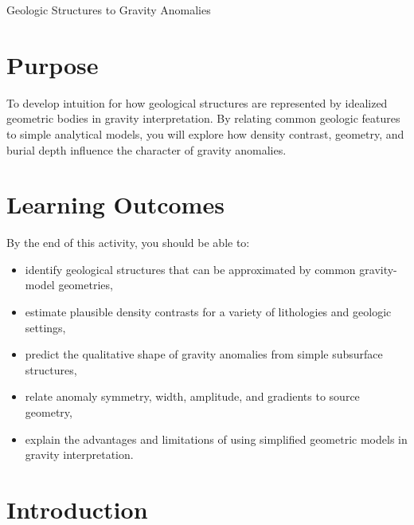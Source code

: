 \newcommand\gax{
  \begin{center}
    \begin{tikzpicture}[scale=0.85]
      \draw[->] (-5,0) -- (5,0) node[above right] {$x$};
      \draw[->] (-5,-1.1) -- (-5,1.1) node[left] {$g_z$};
      \draw[dashed,gray] (-5,0) -- (5,0);
    \end{tikzpicture}
  \end{center}
}

\begin{activity}{Geologic Structures to Gravity Anomalies}

\section*{Purpose}

To develop intuition for how geological structures are represented by idealized geometric bodies in gravity interpretation. By relating common geologic features to simple analytical models, you will explore how density contrast, geometry, and burial depth influence the character of gravity anomalies.

\section*{Learning Outcomes}

By the end of this activity, you should be able to:

\begin{itemize}
  \item identify geological structures that can be approximated by common gravity-model geometries,
  \item estimate plausible density contrasts for a variety of lithologies and geologic settings,
  \item predict the qualitative shape of gravity anomalies from simple subsurface structures,
  \item relate anomaly symmetry, width, amplitude, and gradients to source geometry,
  \item explain the advantages and limitations of using simplified geometric models in gravity interpretation.
\end{itemize}

\section*{Introduction}


\end{activity}
